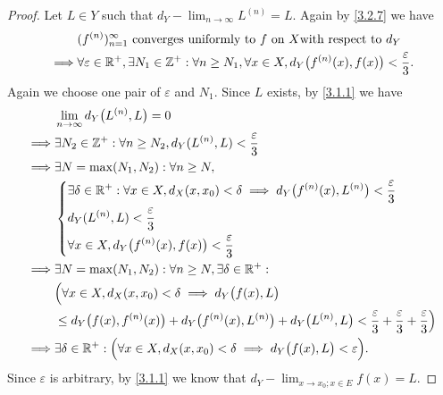 \begin{proof}
  Let \(L \in Y\) such that \(d_Y - \lim_{n \to \infty} L^{(n)} = L\).
  Again by \cref{3.2.7} we have
  \begin{align*}
             & (f^{(n)})_{n = 1}^\infty \text{ converges uniformly to } f \text{ on } X \text{with respect to } d_Y                                              \\
    \implies & \forall \varepsilon \in \mathbb{R}^+, \exists N_1 \in \mathbb{Z}^+ : \forall n \geq N_1, \forall x \in X, d_Y\big(f^{(n)}(x), f(x)\big) < \dfrac{\varepsilon}{3}.
  \end{align*}
  Again we choose one pair of \(\varepsilon\) and \(N_1\).
  Since \(L\) exists, by \cref{3.1.1} we have
  \begin{align*}
             & \lim_{n \to \infty} d_Y\big(L^{(n)}, L\big) = 0                                                                                                                                 \\
    \implies & \exists N_2 \in \mathbb{Z}^+ : \forall n \geq N_2, d_Y(L^{(n)}, L) < \dfrac{\varepsilon}{3}                                                                                             \\
    \implies & \exists N = \max(N_1, N_2) : \forall n \geq N,                                                                                                                                  \\
             & \begin{dcases}
                 \exists \delta \in \mathbb{R}^+ : \forall x \in X, d_X(x, x_0) < \delta \implies d_Y\big(f^{(n)}(x), L^{(n)}\big) < \dfrac{\varepsilon}{3} \\
                 d_Y(L^{(n)}, L) < \dfrac{\varepsilon}{3}                                                                                           \\
                 \forall x \in X, d_Y\big(f^{(n)}(x), f(x)\big) < \dfrac{\varepsilon}{3}
               \end{dcases}                                              \\
    \implies & \exists N = \max(N_1, N_2) : \forall n \geq N, \exists \delta \in \mathbb{R}^+ :                                                                                                        \\
             & \Big(\forall x \in X, d_X(x, x_0) < \delta \implies d_Y\big(f(x), L\big)                                                                                                        \\
             & \leq d_Y\big(f(x), f^{(n)}(x)\big) + d_Y\big(f^{(n)}(x), L^{(n)}\big) + d_Y\big(L^{(n)}, L\big) < \dfrac{\varepsilon}{3} + \dfrac{\varepsilon}{3} + \dfrac{\varepsilon}{3}\Big) \\
    \implies & \exists \delta \in \mathbb{R}^+ : \Big(\forall x \in X, d_X(x, x_0) < \delta \implies d_Y\big(f(x), L\big) < \varepsilon\Big).
  \end{align*}
  Since \(\varepsilon\) is arbitrary, by \cref{3.1.1} we know that \(d_Y - \lim_{x \to x_0 ; x \in E} f(x) = L\).
\end{proof}

